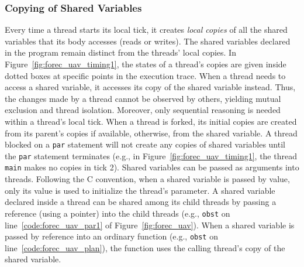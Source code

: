 \subsubsection{Copying of Shared Variables}
\label{sec:forec_shared_variables_copying}
Every time a thread starts its local tick, it creates
\emph{local copies} of all the shared variables that its body
accesses (reads or writes). 
The shared variables declared in the program remain
distinct from the threads' local copies. In Figure~\ref{fig:forec_uav_timing1},
the states of a thread's copies are given inside dotted boxes
at specific points in the execution trace. When a thread needs
to access a shared variable, it accesses its copy of the
shared variable instead. Thus, the changes
made by a thread cannot be observed by others, yielding
mutual exclusion and thread isolation. Moreover, only
sequential reasoning is needed within a thread's local tick.
When a thread is forked, its initial copies are created from
its parent's copies if available, otherwise, from the shared 
variable. A thread blocked on a \verb$par$ statement
will not create any copies of shared variables until 
the \verb$par$ statement terminates
(e.g., in Figure~\ref{fig:forec_uav_timing1}, the thread \verb$main$ 
makes no copies in tick 2). Shared variables can be
passed as arguments into threads. Following the C
convention, when a shared variable is passed by value, 
only its value is used to initialize the thread's parameter.
A shared variable declared inside a thread can be shared
among its child threads by passing a reference (using a
pointer) into the child threads
(e.g., \verb$obst$ on line~\ref{code:forec_uav_par1} of
Figure~\ref{fig:forec_uav}). When a shared variable is
passed by reference into an ordinary function (e.g.,
\verb$obst$ on line~\ref{code:forec_uav_plan}), the function uses the
calling thread's copy of the shared variable. 

